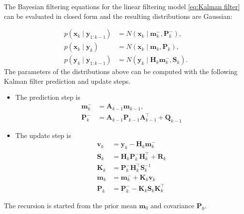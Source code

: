 
\begin{theorem}
The Bayesian filtering equations for the linear filtering model \eqref{eq:Kalman filter} can be evaluated in closed form and the resulting distributions are Gaussian:    

\begin{align}\label{eq:Kalman filter distributions}
    p(\mathbf{x}_k\mid\mathbf{y}_{1:k-1})&= N(\mathbf{x}_k\mid\mathbf{m}_k^-,\mathbf{P}_k^-),\nonumber \\
    p(\mathbf{x}_k\mid\mathbf{y}_k)&= N(\mathbf{x}_k\mid\mathbf{m}_k,\mathbf{P}_k),\nonumber \\
    p(\mathbf{y}_k\mid\mathbf{y}_{1:k-1})&= N(\mathbf{y}_k\mid\mathbf{H}_k\mathbf{m}_k^-,\mathbf{S}_k).
\end{align}
The parameters of the distributions above can be computed with the following Kalman filter prediction and update steps.

\begin{itemize}
    \item The prediction step is
    \begin{align}
        \mathbf{m}_k^- &= \mathbf{A}_{k-1}\mathbf{m}_{k-1}, \nonumber\\
        \mathbf{P}_k^- &= \mathbf{A}_{k-1}\mathbf{P}_{k-1}\mathbf{A}_{k-1}^\top + \mathbf{Q}_{k-1}
    \end{align}

    \item The update step is
    \begin{align}
        \mathbf{v}_k &= \mathbf{y}_k - \mathbf{H}_k\mathbf{m}_k^- \nonumber\\
        \mathbf{S}_k &= \mathbf{H}_k\mathbf{P}_k^-\mathbf{H}_{k}^\top + \mathbf{R}_k \nonumber\\
        \mathbf{K}_k &= \mathbf{P}_k^-\mathbf{H}_k^\top\mathbf{S}_k^{-1} \nonumber\\
        \mathbf{m}_k &= \mathbf{m}_k^- + \mathbf{K}_k\mathbf{v}_k \nonumber\\
        \mathbf{P}_k &= \mathbf{P}_k^- - \mathbf{K}_k\mathbf{S}_k \mathbf{K}_k^\top
    \end{align}
\end{itemize}

The recursion is started from the prior mean $\mathbf{m}_0$ and covariance $\mathbf{P}_0$.
\end{theorem}

